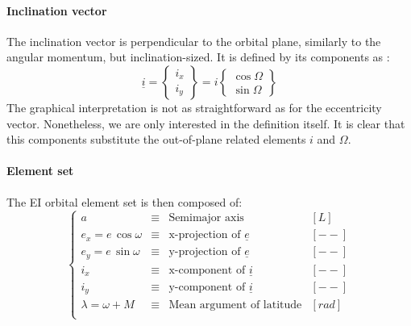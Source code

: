 	\paragraph{Inclination vector \\}
	\indent The inclination vector is perpendicular to the orbital plane, similarly to the angular momentum, but inclination-sized. It is defined by its components as \cite{Eckstein}:
	\[
	\underline{i} =
	\left\{ 
	\begin{array}{c}
	i_x \\[1.5em]
	i_y
	\end{array}
	\right\} = i
	\left\{ 
	\begin{array}{c}
	\cos\Omega \\[1.5em]
	\sin\Omega
	\end{array}
	\right\} 	
	\]
	\indent The graphical interpretation is not as straightforward as for the eccentricity vector. Nonetheless, we are only interested in the definition itself. It is clear that this components substitute the out-of-plane related elements $i$ and $\Omega$.
	\paragraph{Element set \\}
	\indent The EI orbital element set is then composed of:
	\begin{equation}
	\left\{ 
	\begin{array}{llll}
	a & \equiv & \text{Semimajor axis} & [L]\\
	e_x = e\, \cos \omega & \equiv & \text{x-projection of } \underline{e} & [--]\\
	e_y = e\, \sin \omega & \equiv & \text{y-projection of } \underline{e} & [--]\\
	i_x & \equiv & \text{x-component of } \underline{i} & [--]\\
	i_y & \equiv & \text{y-component of } \underline{i} & [--]\\
	\lambda = \omega + M & \equiv & \text{Mean argument of latitude} & [rad]\\
	\end{array}
	\right.
	\end{equation}
